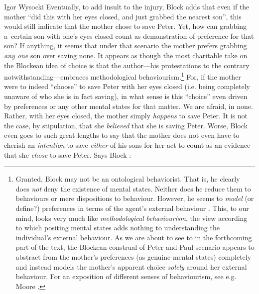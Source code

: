 \begin{artengenv}{Igor Wysocki}
Eventually, to add insult to the injury, Block 
\parencite*[][p.51]{block_response_2022} %
 adds that even if the mother ``did this with her eyes closed, and just grabbed the nearest son'', this would still indicate that the mother chose to save Peter. Yet, how can grabbing a~certain son with one's eyes closed count as demonstration of preference for that son? If anything, it seems that under that scenario the mother prefers grabbing \textit{any one} son over saving none. It appears as though the most charitable take on the Blockean idea of choice is that the author---his protestations to the contrary notwithstanding---embraces methodological behaviourism.\footnote{Granted, Block may not be an ontological behaviorist. That is, he clearly does \textit{not} deny the existence of mental states. Neither does he reduce them to behaviours or mere dispositions to behaviour. However, he seems to \textit{model} (or define?) preferences in terms of the agent's external behaviour 
\parencite[][pp.54–55]{block_response_2022}. %
This, to our mind, looks very much like \textit{methodological behaviourism}, the view according to which positing mental states adds nothing to understanding the individual's external behaviour. As we are about to see to in the forthcoming part of the text, the Blockean construal of Peter-and-Paul scenario appears to abstract from the mother's preferences (as genuine mental states) completely and instead models the mother's apparent choice \textit{solely} around her external behaviour. For an exposition of different senses of behaviourism, see e.g. Moore 
\parencite*[][]{moore_distinguishing_2001}. %
 } For, if the mother were to indeed ``choose'' to save Peter with her eyes closed (i.e. being completely unaware of who she is in fact saving), in what sense is this ``choice'' even driven by preferences or any other mental states for that matter. We are afraid, in none. Rather, with her eyes closed, the mother simply \textit{happens} to save Peter. It is not the case, by stipulation, that she \textit{believed} that she is saving Peter. Worse, Block even goes to such great lengths to say that the mother does not even have to cherish an \textit{intention} to save \textit{either} of his sons for her act to count as an evidence that she \textit{chose} to save Peter. Says Block 
\parencite*[][pp.54–55]{block_response_2022}:%





\end{artengenv}
